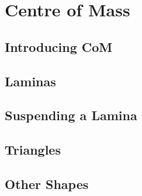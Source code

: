 \documentclass[../alevelmaths.tex]{subfiles}
\begin{document}
\chapter{Centre of Mass}
\section{Introducing CoM}
\section{Laminas}
\section{Suspending a Lamina}
\section{Triangles}
\section{Other Shapes}
\end{document}
